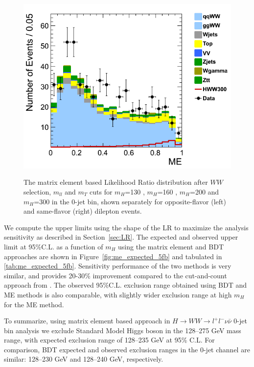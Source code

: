 \begin{figure}[!hbtp]
{\includegraphics[width=.40\textwidth]{figures/ME_mH300_0j_sf_stack_lin.png}}\\                                                 
\caption{The matrix element based Likelihood Ratio distribution after $WW$ selection, $m_{ll}$ and $m_{T}$ cuts                      
for $m_H$=130 \GeVcc {}, $m_H$=160 \GeVcc {}, $m_H$=200 \GeVcc 
{} and $m_H$=300 \GeVcc {} in the 0-jet bin, shown separately for opposite-flavor (left)
and same-flavor (right) dilepton events.}                                            
\label{fig:lrstacks}                                                                                          
\end{figure}                      

We compute the upper limits using the shape of the LR to maximize the analysis sensitivity as described in 
Section~\ref{sec:LR}. The expected and observed upper limit at 95\%C.L. as a function of $m_H$ using the matrix element and BDT approaches are shown in 
Figure~\ref{fig:me_expected_5fb} and tabulated in \ref{tab:me_expected_5fb}. Sensitivity performance of the two methods is very similar, and provides 20-30\% improvement compared to the cut-and-count approach from \cite{ref:HWW2011smurf}. The observed 95\%C.L. exclusion range obtained using BDT and ME methods is also comparable, with slightly wider exclusion range at high $m_{H}$ for the ME method. 

To summarize, using matrix element based approach in $H\rightarrow WW \rightarrow l^{+}l^{-}\nu\bar{\nu}$ 0-jet bin analysis we exclude Standard Model Higgs boson in the 128--275 GeV mass range, with expected exclusion range of 128--235 GeV at 95\% C.L. For comparison, BDT expected and observed exclusion ranges in the 0-jet channel are similar: 128--230 GeV and 128--240 GeV, respectively.  

